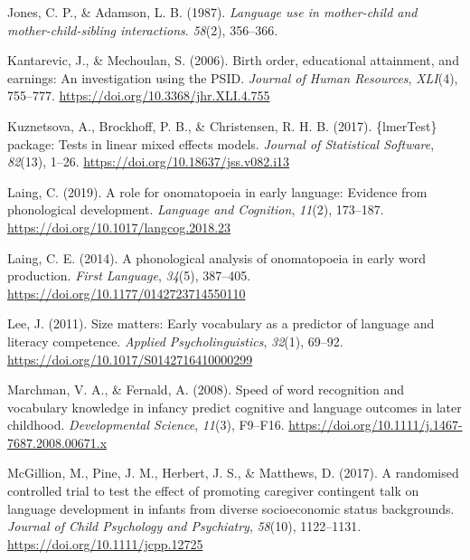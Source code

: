 \documentclass[
  english,
  man,floatsintext]{apa6}
\newlength{\cslhangindent}
\newenvironment{CSLReferences}[2] %
 {%
  \setlength{\parindent}{0pt}
  \ifodd #1 \everypar{\setlength{\hangindent}{\cslhangindent}}\ignorespaces\fi
  \ifnum #2 > 0
  \setlength{\parskip}{#2\baselineskip}
  \fi
 }%
 {}
\begin{document}
\begin{CSLReferences}{1}{0}
\leavevmode{}%
Jones, C. P., \& Adamson, L. B. (1987). \emph{Language use in mother-child and mother-child-sibling interactions}. \emph{58}(2), 356--366.

\leavevmode{}%
Kantarevic, J., \& Mechoulan, S. (2006). Birth order, educational attainment, and earnings: An investigation using the {PSID}. \emph{Journal of Human Resources}, \emph{{XLI}}(4), 755--777. \url{https://doi.org/10.3368/jhr.XLI.4.755}

\leavevmode{}%
Kuznetsova, A., Brockhoff, P. B., \& Christensen, R. H. B. (2017). \{{lmerTest}\} package: Tests in linear mixed effects models. \emph{Journal of Statistical Software}, \emph{82}(13), 1--26. \url{https://doi.org/10.18637/jss.v082.i13}

\leavevmode{}%
Laing, C. (2019). A role for onomatopoeia in early language: Evidence from phonological development. \emph{Language and Cognition}, \emph{11}(2), 173--187. \url{https://doi.org/10.1017/langcog.2018.23}

\leavevmode{}%
Laing, C. E. (2014). A phonological analysis of onomatopoeia in early word production. \emph{First Language}, \emph{34}(5), 387--405. \url{https://doi.org/10.1177/0142723714550110}

\leavevmode{}%
Lee, J. (2011). Size matters: Early vocabulary as a predictor of language and literacy competence. \emph{Applied Psycholinguistics}, \emph{32}(1), 69--92. \url{https://doi.org/10.1017/S0142716410000299}

\leavevmode{}%
Marchman, V. A., \& Fernald, A. (2008). Speed of word recognition and vocabulary knowledge in infancy predict cognitive and language outcomes in later childhood. \emph{Developmental Science}, \emph{11}(3), F9--F16. \url{https://doi.org/10.1111/j.1467-7687.2008.00671.x}

\leavevmode{}%
McGillion, M., Pine, J. M., Herbert, J. S., \& Matthews, D. (2017). A randomised controlled trial to test the effect of promoting caregiver contingent talk on language development in infants from diverse socioeconomic status backgrounds. \emph{Journal of Child Psychology and Psychiatry}, \emph{58}(10), 1122--1131. \url{https://doi.org/10.1111/jcpp.12725}


\end{CSLReferences}
\end{document}
